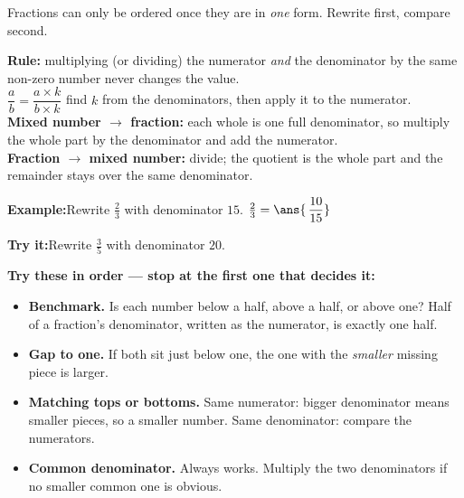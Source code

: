 \documentclass[12pt]{article}
\begin{document}

\noindent\small Fractions can only be ordered once they are in \emph{one}
form. Rewrite first, compare second.\normalsize


\begin{formulabox}
\textbf{Rule:} multiplying (or dividing) the numerator \emph{and} the
denominator by the same non-zero number never changes the value.\\[3pt]
\hspace*{0.4cm}$\dfrac{a}{b} = \dfrac{a \times k}{b \times k}$
\qquad find $k$ from the denominators, then apply it to the numerator.\\[3pt]
\textbf{Mixed number $\rightarrow$ fraction:} each whole is one full
denominator, so multiply the whole part by the denominator and add the
numerator.\\[3pt]
\textbf{Fraction $\rightarrow$ mixed number:} divide; the quotient is the whole
part and the remainder stays over the same denominator.
\end{formulabox}

\begin{examplebox}
\textbf{Example:}\quad Rewrite $\tfrac{2}{3}$ with denominator $15$.
$\tfrac{2}{3} = \ans{\,\dfrac{10}{15}}$
\end{examplebox}

\begin{tryitbox}
\textbf{Try it:}\quad Rewrite $\tfrac{3}{5}$ with denominator $20$.\\[2pt]
\end{tryitbox}


\begin{formulabox}
\textbf{Try these in order --- stop at the first one that decides it:}
\begin{itemize}[leftmargin=0.8cm, itemsep=1pt, topsep=1pt]
  \item \textbf{Benchmark.} Is each number below a half, above a half, or above
        one? Half of a fraction's denominator, written as the numerator, is
        exactly one half.
  \item \textbf{Gap to one.} If both sit just below one, the one with the
        \emph{smaller} missing piece is larger.
  \item \textbf{Matching tops or bottoms.} Same numerator: bigger denominator
        means smaller pieces, so a smaller number. Same denominator: compare
        the numerators.
  \item \textbf{Common denominator.} Always works. Multiply the two
        denominators if no smaller common one is obvious.
\end{itemize}
\end{formulabox}
\end{document}
